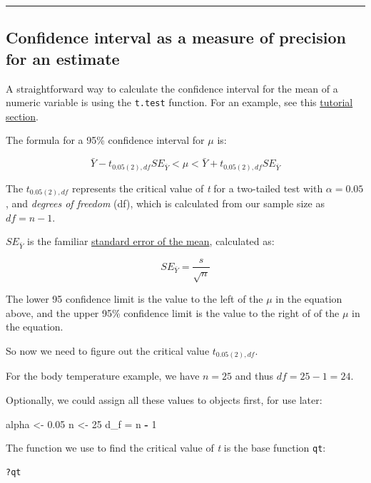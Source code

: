 \documentclass[
]{book}
\newenvironment{Shaded}{\begin{snugshade}}{\end{snugshade}}
\newcommand{\DecValTok}[1]{\textcolor[rgb]{0.00,0.00,0.81}{#1}}
\newcommand{\FloatTok}[1]{\textcolor[rgb]{0.00,0.00,0.81}{#1}}
\newcommand{\NormalTok}[1]{#1}
\newcommand{\OtherTok}[1]{\textcolor[rgb]{0.56,0.35,0.01}{#1}}
\newcommand{\SpecialCharTok}[1]{\textcolor[rgb]{0.81,0.36,0.00}{\textbf{#1}}}
\begin{document}
\begin{center}\rule{0.5\linewidth}{0.5pt}\end{center}

\subsection{Confidence interval as a measure of precision for an estimate}\label{conf_precision}

A straightforward way to calculate the confidence interval for the mean of a numeric variable is using the \texttt{t.test} function. For an example, see this \hyperref[onesamp_test]{tutorial section}.

The formula for a 95\% confidence interval for \(\mu\) is:

\[\bar{Y} - t_{0.05(2),df}SE_{\bar{Y}} < \mu <  \bar{Y} + t_{0.05(2),df}SE_{\bar{Y}}\]

The \(t_{0.05(2),df}\) represents the critical value of \emph{t} for a two-tailed test with \(\alpha = 0.05\), and \emph{degrees of freedom} (df), which is calculated from our sample size as \(df = n - 1\).

\(SE_{\bar{Y}}\) is the familiar \hyperref[sem_page]{standard error of the mean}, calculated as:

\[SE_\bar{Y} = \frac{s}{\sqrt{n}}\]

The lower 95 confidence limit is the value to the left of the \(\mu\) in the equation above, and the upper 95\% confidence limit is the value to the right of of the \(\mu\) in the equation.

So now we need to figure out the critical value \(t_{0.05(2),df}\).

For the body temperature example, we have \(n = 25\) and thus \(df = 25-1 = 24\).

Optionally, we could assign all these values to objects first, for use later:

\begin{Shaded}
\begin{Highlighting}[]
\NormalTok{alpha }\OtherTok{\textless{}{-}} \FloatTok{0.05}
\NormalTok{n }\OtherTok{\textless{}{-}} \DecValTok{25}
\NormalTok{d\_f }\OtherTok{=}\NormalTok{ n }\SpecialCharTok{{-}} \DecValTok{1}
\end{Highlighting}
\end{Shaded}

The function we use to find the critical value of \emph{t} is the base function \texttt{qt}:

\begin{verbatim}
?qt
\end{verbatim}
\end{document}
